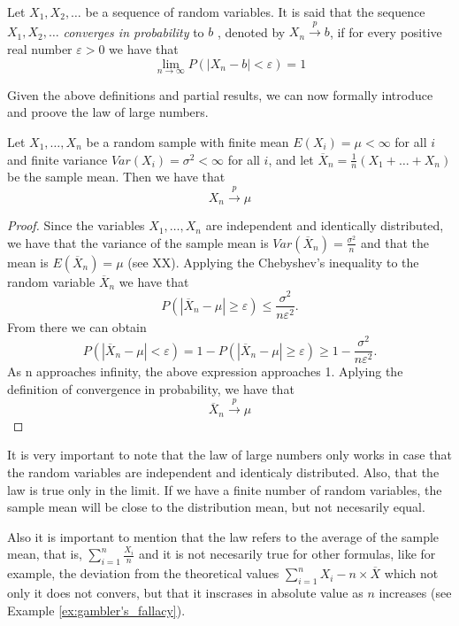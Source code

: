 \begin{definition}
Let $X_{1}, X_{2}, \ldots$ be a sequence  of random variables. It is said that the sequence $X_{1}, X_{2}, \ldots$ \emph{converges in probability} to $b$ , denoted by $X_{n} \overset{p}{\rightarrow}b$, if for every positive real number $\varepsilon>0$ we have that
\[
\lim_{n \rightarrow \infty} P \left( \left| X_{n} - b \right| < \varepsilon \right) = 1
\]
\end{definition}

Given the above definitions and partial results, we can now formally introduce and proove the law of large numbers.

\begin{theorem}
\label{th:law_large_numbers}
Let $X_1, \ldots, X_n$ be a random sample with finite mean $E \left( X_i \right) = \mu <\infty$ for all $i$ and finite variance $Var \left( X_i \right) = \sigma^2 <\infty$ for all $i$, and let $\overline {X}_n = \frac {1}{n} \left( X_1 + \ldots + X_n \right)$ be the sample mean. Then we have that
\[
X_n \overset{p}{\rightarrow} \mu
\]
\end{theorem}
\begin{proof}
Since the variables $X_1, \ldots, X_n$ are independent and identically distributed, we have that the variance of the sample mean is $Var \left( \overline {X}_n \right) = \frac{\sigma^2}{n}$ and that the mean is $E \left( \overline {X}_n \right) = \mu$ (see XX). Applying the Chebyshev's inequality to the random variable $\overline {X}_n$ we have that
\[
P \left( \left| \overline {X}_n- \mu \right| \geq \varepsilon \right) \leq \frac{\sigma ^2}{n \varepsilon^2}.
\]
From there we can obtain
\[
P \left( \left| \overline {X}_n - \mu \right| < \varepsilon \right) = 1 - P \left( \left| \overline {X}_n - \mu \right| \geq \varepsilon \right) \geq 1 - \frac{\sigma ^2}{n \varepsilon^2}.
\]
As n approaches infinity, the above expression approaches 1. Aplying the definition of convergence in probability, we have that
\[
\overline{X}_n \overset{p}{\rightarrow} \mu
\]
\end{proof}

It is very important to note that the law of large numbers only works in case that the random variables are independent and identicaly distributed. Also, that the law is true only in the limit. If we have a finite number of random variables, the sample mean will be close to the distribution mean, but not necesarily equal.

Also it is important to mention that the law refers to the average of the sample mean, that is, $\sum_{i=1}^{n} \frac {X_{i}}{n}$ and it is not necesarily true for other formulas, like for example, the deviation from the theoretical values $\sum_{i=1}^{n} X_{i} - n \times \overline {X}$ which not only it does not convers, but that it inscrases in absolute value as $n$ increases (see Example \ref{ex:gambler's_fallacy}).

